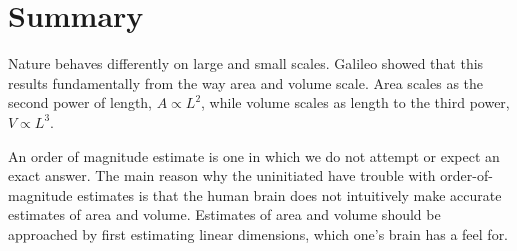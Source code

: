 

\section{Summary}

Nature behaves differently on large and small scales.
Galileo showed that this results fundamentally from the way
area and volume scale. Area scales as the second power of
length, $A\propto L^2$, while volume scales as length to the
third power, $V\propto L^3$.

An order of magnitude estimate is one in which we do not
attempt or expect an exact answer. The main reason why the
uninitiated have trouble with order-of-magnitude estimates
is that the human brain does not intuitively make accurate
estimates of area and volume. Estimates of area and volume
should be approached by first estimating linear dimensions,
which one's brain has a feel for.


\divider
\vspace{2mm}

\startexercises

